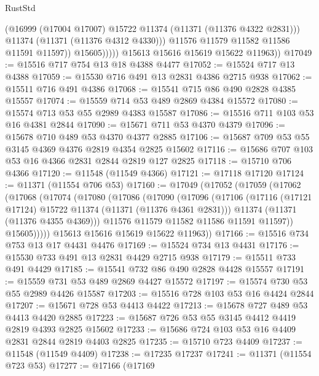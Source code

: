 \begin{lexlean}{RustStd}
\begin{coremodule}
{\begin{coremodule}
{{{{{{{{{{{{{{{{{{{{{{{{{{{{{{{{{                        (@16999 (@17004 @17007) @15722 @11374 (@11371 (@11376 @4322 @2831)))
                        @11374
                        (@11371 (@11376 @4312 @4330)))
                      @11576
                      @11579
                      @11582
                      @11586
                      @11591
                      @11597))
                  @15605)))))
        @15613
        @15616
        @15619
        @15622
        @11963))
@17049 := @15516 @717 @754 @13 @18 @4388 @4477
@17052 := @15524 @717 @13 @4388
@17059 := @15530 @716 @491 @13 @2831 @4386 @2715 @938
@17062 := @15511 @716 @491 @4386
@17068 := @15541 @715 @86 @490 @2828 @4385 @15557
@17074 := @15559 @714 @53 @489 @2869 @4384 @15572
@17080 := @15574 @713 @53 @55 @2989 @4383 @15587
@17086 := @15516 @711 @103 @53 @16 @4381 @2844
@17090 := @15671 @711 @53 @4370 @4379
@17096 := @15678 @710 @489 @53 @4370 @4377 @2885
@17106 := @15687 @709 @53 @55 @3145 @4369 @4376 @2819 @4354 @2825 @15602
@17116 := @15686 @707 @103 @53 @16 @4366 @2831 @2844 @2819 @127 @2825
@17118 := @15710 @706 @4366
@17120 := @11548 (@11549 @4366)
@17121 := @17118 @17120
@17124 := @11371 (@11554 @706 @53)
@17160 := @17049
    (@17052
      (@17059
        (@17062
          (@17068
            (@17074
              (@17080
                (@17086
                  (@17090
                    (@17096
                      (@17106
                        (@17116 (@17121 @17124) @15722 @11374 (@11371 (@11376 @4361 @2831)))
                        @11374
                        (@11371 (@11376 @4355 @4369)))
                      @11576
                      @11579
                      @11582
                      @11586
                      @11591
                      @11597))
                  @15605)))))
        @15613
        @15616
        @15619
        @15622
        @11963))
@17166 := @15516 @734 @753 @13 @17 @4431 @4476
@17169 := @15524 @734 @13 @4431
@17176 := @15530 @733 @491 @13 @2831 @4429 @2715 @938
@17179 := @15511 @733 @491 @4429
@17185 := @15541 @732 @86 @490 @2828 @4428 @15557
@17191 := @15559 @731 @53 @489 @2869 @4427 @15572
@17197 := @15574 @730 @53 @55 @2989 @4426 @15587
@17203 := @15516 @728 @103 @53 @16 @4424 @2844
@17207 := @15671 @728 @53 @4413 @4422
@17213 := @15678 @727 @489 @53 @4413 @4420 @2885
@17223 := @15687 @726 @53 @55 @3145 @4412 @4419 @2819 @4393 @2825 @15602
@17233 := @15686 @724 @103 @53 @16 @4409 @2831 @2844 @2819 @4403 @2825
@17235 := @15710 @723 @4409
@17237 := @11548 (@11549 @4409)
@17238 := @17235 @17237
@17241 := @11371 (@11554 @723 @53)
@17277 := @17166
    (@17169
}}}}}}}}}}}}}}}}}}}}}}}}}}}}}}}}}
\end{coremodule}}
\end{coremodule}
\end{lexlean}
